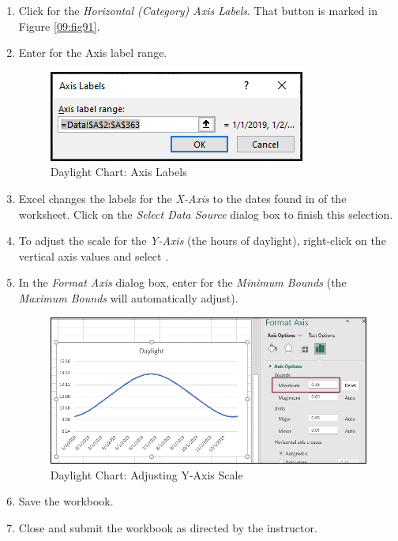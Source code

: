 \begin{enumerate}
	\item Click  for the \textit{Horizontal (Category) Axis Labels}. That button is marked in Figure \ref{09:fig91}.
	\item Enter  for the Axis label range.
	
	\begin{figure}[H]
		\centering
		\includegraphics[width=\maxwidth{.75\linewidth}]{gfx/ch09_fig92}
		\caption{Daylight Chart: Axis Labels}
		\label{09:fig92}
	\end{figure}
	
	\item Excel changes the labels for the \textit{X-Axis} to the dates found in  of the  worksheet. Click  on the \textit{Select Data Source} dialog box to finish this selection.
	\item To adjust the scale for the \textit{Y-Axis} (the hours of daylight), right-click on the vertical axis values and select .
	\item In the \textit{Format Axis} dialog box, enter  for the \textit{Minimum Bounds} (the \textit{Maximum Bounds} will automatically adjust).
	
	\begin{figure}[H]
		\centering
		\includegraphics[width=\maxwidth{.95\linewidth}]{gfx/ch09_fig93}
		\caption{Daylight Chart: Adjusting Y-Axis Scale}
		\label{09:fig93}
	\end{figure}
	\item Save the  workbook.
	\item Close and submit the  workbook as directed by the instructor.

\end{enumerate}





	


